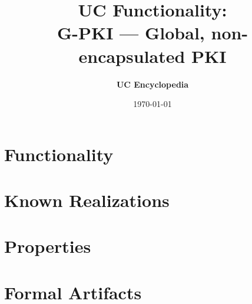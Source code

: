 \documentclass[11pt,a4paper]{article}
\title{\textbf{\Large UC Functionality:}\\[0.2em] \Large G-PKI --- Global, non-encapsulated PKI}
\author{\textbf{UC Encyclopedia}}
\date{\today}
\newtheorem{functionality}{Functionality}
\begin{document}
\maketitle

\begin{abstract}
\end{abstract}

\section{Functionality}

%

\section{Known Realizations}


\section{Properties}


\section{Formal Artifacts}

\end{document}
